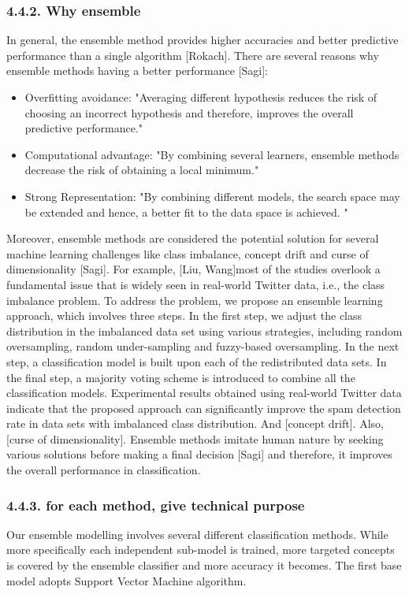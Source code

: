 \documentclass[runningheads]{llncs}
\begin{document}
\subsubsection{4.4.2. Why ensemble}
In general, the ensemble method provides higher accuracies and better predictive performance than a single algorithm [Rokach]. There are several reasons why ensemble methods having a better performance [Sagi]: 
\renewcommand\labelitemii{$\square$}
\begin{itemize}
  \item Overfitting avoidance: "Averaging different hypothesis reduces the risk of choosing an incorrect hypothesis and therefore, improves the overall predictive performance."
  \item Computational advantage: "By combining several learners, ensemble methods decrease the risk of obtaining a local minimum."
  \item Strong Representation: "By combining different models, the search space may be extended and hence, a better fit to the data space is achieved. "
\end{itemize}
Moreover, ensemble methods are considered the potential solution for several machine learning challenges like class imbalance, concept drift and curse of dimensionality [Sagi]. For example, [Liu, Wang]most of the studies overlook a fundamental issue that is widely seen in real-world Twitter data, i.e., the class imbalance problem. To address the problem, we propose an ensemble learning approach, which involves three steps. In the first step, we adjust the class distribution in the imbalanced data set using various strategies, including random oversampling, random under-sampling and fuzzy-based oversampling. In the next step, a classification model is built upon each of the redistributed data sets. In the final step, a majority voting scheme is introduced to combine all the classification models. Experimental results obtained using real-world Twitter data indicate that the proposed approach can significantly improve the spam detection rate in data sets with imbalanced class distribution. And [concept drift]. Also, [curse of dimensionality].
%
Ensemble methods imitate human nature by seeking various solutions before making a final decision [Sagi] and therefore, it improves the overall performance in classification. 
%
%
%
%
\subsubsection{4.4.3. for each method, give technical purpose}
Our ensemble modelling involves several different classification methods. While more specifically each independent sub-model is trained, more targeted concepts is covered by the ensemble classifier and more accuracy it becomes. The first base model adopts Support Vector Machine algorithm. 
%
%
\end{document}

